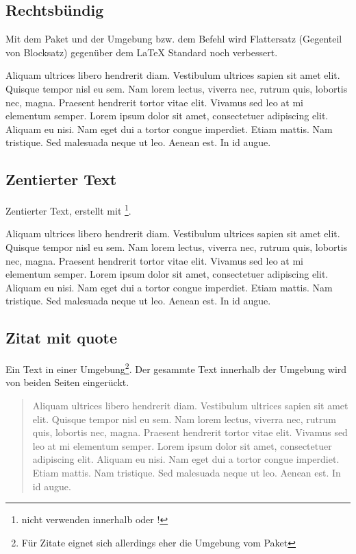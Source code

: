 \subsection{Rechtsbündig}
%
Mit dem Paket  und der Umgebung  bzw. dem Befehl  wird Flattersatz (Gegenteil von Blocksatz) gegenüber dem \LaTeX{} Standard noch verbessert.

\begin{FlushRight}
Aliquam ultrices libero hendrerit diam. Vestibulum ultrices sapien sit amet elit. Quisque tempor nisl eu sem. Nam lorem lectus, viverra nec, rutrum quis, lobortis nec, magna. Praesent hendrerit tortor vitae elit. Vivamus sed leo at mi elementum semper. Lorem ipsum dolor sit amet, consectetuer adipiscing elit. Aliquam eu nisi. Nam eget dui a tortor congue imperdiet. Etiam mattis. Nam tristique. Sed malesuada neque ut leo. Aenean est. In id augue.
\end{FlushRight}
%
\subsection{Zentierter Text}
%
Zentierter Text, erstellt mit \footnote{nicht verwenden innerhalb  oder !}.
\begin{center}
Aliquam ultrices libero hendrerit diam. Vestibulum ultrices sapien sit amet elit. Quisque tempor nisl eu sem. Nam lorem lectus, viverra nec, rutrum quis, lobortis nec, magna. Praesent hendrerit tortor vitae elit. Vivamus sed leo at mi elementum semper. Lorem ipsum dolor sit amet, consectetuer adipiscing elit. Aliquam eu nisi. Nam eget dui a tortor congue imperdiet. Etiam mattis. Nam tristique. Sed malesuada neque ut leo. Aenean est. In id augue.
\end{center}

\subsection{Zitat mit quote}
Ein Text in einer  Umgebung\footnote{Für Zitate eignet sich allerdings eher die Umgebung  vom Paket }. Der gesammte Text innerhalb der Umgebung wird von beiden Seiten eingerückt.

\begin{quote}
Aliquam ultrices libero hendrerit diam. Vestibulum ultrices sapien sit amet elit. Quisque tempor nisl eu sem. Nam lorem lectus, viverra nec, rutrum quis, lobortis nec, magna. Praesent hendrerit tortor vitae elit. Vivamus sed leo at mi elementum semper. Lorem ipsum dolor sit amet, consectetuer adipiscing elit. Aliquam eu nisi. Nam eget dui a tortor congue imperdiet. Etiam mattis. Nam tristique. Sed malesuada neque ut leo. Aenean est. In id augue.
\end{quote}



